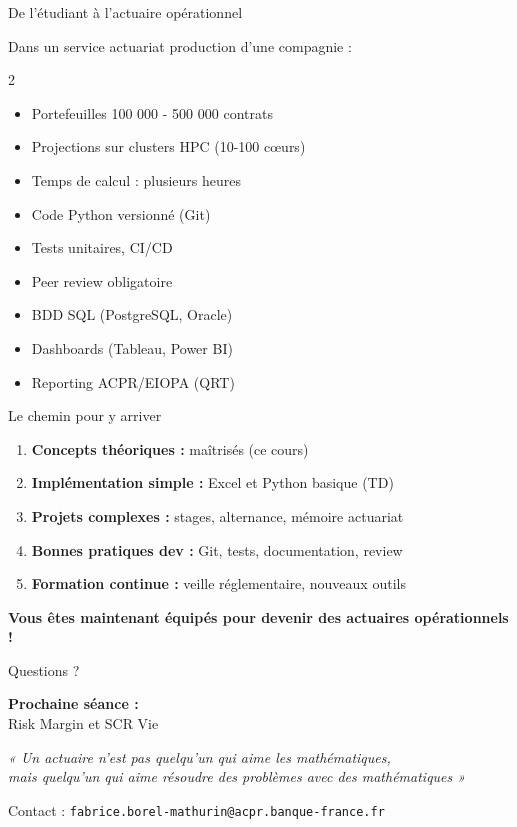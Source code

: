 \documentclass[10pt,aspectratio=169]{beamer}
\begin{document}
\begin{frame}{De l'étudiant à l'actuaire opérationnel}
\begin{block}{Dans un service actuariat production d'une compagnie :}
\begin{multicols}{2}
\begin{itemize}
    \item Portefeuilles 100 000 - 500 000 contrats
    \item Projections sur clusters HPC (10-100 cœurs)
    \item Temps de calcul : plusieurs heures
    \item Code Python versionné (Git)
    \item Tests unitaires, CI/CD
    \item Peer review obligatoire
    \item BDD SQL (PostgreSQL, Oracle)
    \item Dashboards (Tableau, Power BI)
    \item Reporting ACPR/EIOPA (QRT)
\end{itemize}
\end{multicols}
\end{block}

\vspace{0.3cm}
\begin{exampleblock}{Le chemin pour y arriver}
\begin{enumerate}
    \item[$\checkmark$] \textbf{Concepts théoriques :} maîtrisés (ce cours)
    \item[$\checkmark$] \textbf{Implémentation simple :} Excel et Python basique (TD)
    \item[$\rightarrow$] \textbf{Projets complexes :} stages, alternance, mémoire actuariat
    \item[$\rightarrow$] \textbf{Bonnes pratiques dev :} Git, tests, documentation, review
    \item[$\rightarrow$] \textbf{Formation continue :} veille réglementaire, nouveaux outils
\end{enumerate}
\end{exampleblock}

\textbf{Vous êtes maintenant équipés pour devenir des actuaires opérationnels !}
\end{frame}

\begin{frame}[standout]
\Huge Questions ?

\vspace{1.5cm}

\Large
\textbf{Prochaine séance :}\\
Risk Margin et SCR Vie

\vspace{1cm}

\normalsize
\textit{« Un actuaire n'est pas quelqu'un qui aime les mathématiques, \\
mais quelqu'un qui aime résoudre des problèmes avec des mathématiques »}

\vspace{1.5cm}

Contact : \texttt{fabrice.borel-mathurin@acpr.banque-france.fr}
\end{frame}
\end{document}
